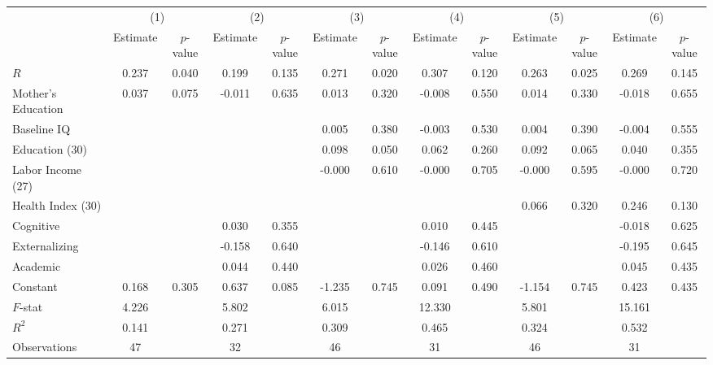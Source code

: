 \begin{tabular}{lcccccccccccc} \toprule
 & \multicolumn{2}{c}{(1)}  &  \multicolumn{2}{c}{(2)}  &  \multicolumn{2}{c}{(3)}  &  \multicolumn{2}{c}{(4)}  & \multicolumn{2}{c}{(5)} & \multicolumn{2}{c}{(6)} \\  
 & Estimate & $p$-value & Estimate & $p$-value & Estimate & $p$-value & Estimate & $p$-value & Estimate & $p$-value & Estimate & $p$-value \\ \midrule 
$R$ &     0.237 &     0.040 &     0.199 &     0.135 &     0.271 &     0.020 &     0.307 &     0.120 &     0.263 &     0.025 &     0.269 &     0.145 \\  
Mother's Education &     0.037 &     0.075 &    -0.011 &     0.635 &     0.013 &     0.320 &    -0.008 &     0.550 &     0.014 &     0.330 &    -0.018 &     0.655 \\  
Baseline IQ &         &         &         &         &     0.005 &     0.380 &    -0.003 &     0.530 &     0.004 &     0.390 &    -0.004 &     0.555 \\  
Education (30) &         &         &         &         &     0.098 &     0.050 &     0.062 &     0.260 &     0.092 &     0.065 &     0.040 &     0.355 \\  
Labor Income (27) &         &         &          &          &    -0.000 &     0.610 &    -0.000 &     0.705 &    -0.000 &     0.595 &    -0.000 &     0.720 \\  
Health Index (30) &          &         &          &         &         &         &         &         &     0.066 &     0.320 &     0.246 &     0.130 \\  
Cognitive &          &          &     0.030 &     0.355 &         &         &     0.010 &     0.445 &         &         &    -0.018 &     0.625 \\  
Externalizing &         &         &    -0.158 &     0.640 &         &         &    -0.146 &     0.610 &         &         &    -0.195 &     0.645 \\  
Academic &         &         &     0.044 &     0.440 &         &         &     0.026 &     0.460 &         &         &     0.045 &     0.435 \\  
Constant &     0.168 &     0.305 &     0.637 &     0.085 &    -1.235 &     0.745 &     0.091 &     0.490 &    -1.154 &     0.745 &     0.423 &     0.435 \\  \midrule
$F$-stat &     4.226 &         &     5.802 &         &     6.015 &         &    12.330 &         &     5.801 &         &    15.161 &         \\   
$R^2$ &     0.141 &         &     0.271 &         &     0.309 &         &     0.465 &         &     0.324 &         &     0.532 &         \\  
Observations &    47&         &    32 &         &    46 &         &    31 &         &    46 &         &    31 &         \\  
\bottomrule \end{tabular}

